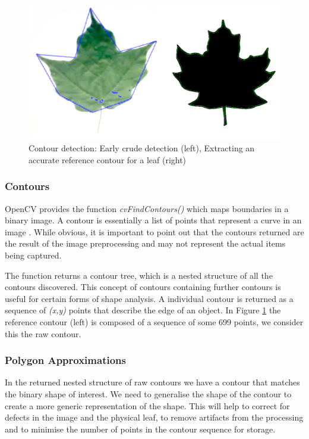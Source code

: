 \begin{figure}[h!]
\centering
    \includegraphics[width=1\textwidth]{leaf_identification/images/contours.png}
    \caption{Contour detection: Early crude detection (left), Extracting an accurate reference contour for a leaf (right)}%
    \label{contours}
\end{figure}

\subsubsection{Contours}

OpenCV provides the function \emph{cvFindContours()} which maps boundaries in a binary image. A contour is essentially a list of points that represent a curve in an image \cite{bradski08}. While obvious, it is important to point out that the contours returned are the result of the image preprocessing and may not represent the actual items being captured.

The function returns a contour tree, which is a nested structure of all the contours discovered. This concept of contours containing further contours is useful for certain forms of shape analysis. A individual contour is returned as a sequence of \emph{(x,y)} points that describe the edge of an object. In Figure \ref{contours} the reference contour (left) is composed of a sequence of some 699 points, we consider this the raw contour.


\subsubsection{Polygon Approximations}
In the returned nested structure of raw contours we have a contour that matches the binary shape of interest. We need to generalise the shape of the contour to create a more generic representation of the shape. This will help to correct for defects in the image and the physical leaf, to remove artifacts from the processing and to minimise the number of points in the contour sequence for storage. 

